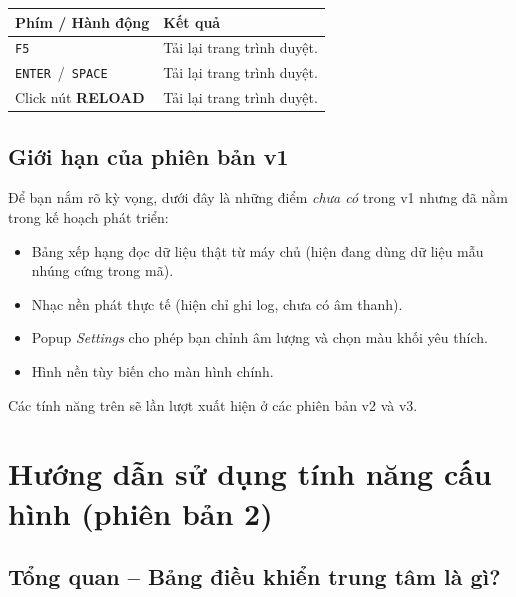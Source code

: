 \documentclass[12pt,a4paper]{article}
\begin{document}
\begin{tabularx}{\linewidth}{|l|X|}
    \hline
    \textbf{Phím / Hành động} & \textbf{Kết quả} \\
    \hline
    \texttt{F5}                                   & Tải lại trang trình duyệt. \\
    \hline
    \texttt{ENTER} \,/\, \texttt{SPACE}           & Tải lại trang trình duyệt. \\
    \hline
    Click nút \textbf{RELOAD}                     & Tải lại trang trình duyệt. \\
    \hline
\end{tabularx}

\subsection{Giới hạn của phiên bản v1}
Để bạn nắm rõ kỳ vọng, dưới đây là những điểm \emph{chưa có} trong v1 nhưng đã nằm trong kế hoạch phát triển:
\begin{itemize}
    \item Bảng xếp hạng đọc dữ liệu thật từ máy chủ (hiện đang dùng dữ liệu mẫu nhúng cứng trong mã).
    \item Nhạc nền phát thực tế (hiện chỉ ghi log, chưa có âm thanh).
    \item Popup \textit{Settings} cho phép bạn chỉnh âm lượng và chọn màu khối yêu thích.
    \item Hình nền tùy biến cho màn hình chính.
\end{itemize}
Các tính năng trên sẽ lần lượt xuất hiện ở các phiên bản v2 và v3.

\newpage
\section{Hướng dẫn sử dụng tính năng cấu hình (phiên bản 2)}

\noindent{}
\vspace{8pt}

\subsection{Tổng quan -- Bảng điều khiển trung tâm là gì?}
\end{document}
